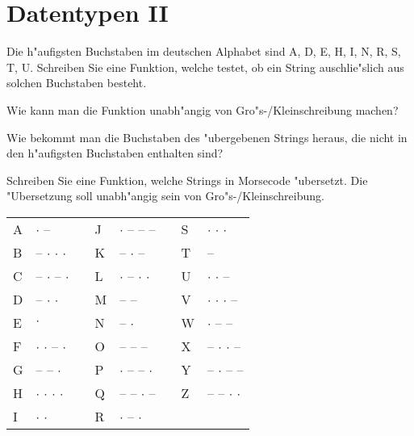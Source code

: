 \section*{Datentypen II}

\begin{aufgabe}
Die h"aufigsten Buchstaben im deutschen Alphabet sind A, D, E, H, I, N, R, S, T, U. Schreiben Sie eine Funktion, welche testet, ob ein String auschlie"slich aus solchen Buchstaben besteht.
\begin{teilaufgabe}
Wie kann man die Funktion unabh"angig von Gro"s-/Kleinschreibung machen?
\end{teilaufgabe}
\begin{teilaufgabe}
Wie bekommt man die Buchstaben des "ubergebenen Strings heraus, die nicht in den h"aufigsten Buchstaben enthalten sind?
\end{teilaufgabe}
\end{aufgabe}


\begin{aufgabe}[Morsecode]
Schreiben Sie eine Funktion, welche Strings in Morsecode "ubersetzt. Die "Ubersetzung soll unabh"angig sein von Gro"s-/Kleinschreibung.

\begin{tabular}[h]{|l|ll|l|ll|l|l|}
\hline
A&$\cdot$ --&&J&$\cdot$ -- -- --&&S&$\cdot$ $\cdot$ $\cdot$\\
B&-- $\cdot$ $\cdot$ $\cdot$&&K&-- $\cdot$ --&&T&--\\
C&-- $\cdot$ -- $\cdot$&&L&$\cdot$ -- $\cdot$ $\cdot$&&U&$\cdot$ $\cdot$ --\\
D&-- $\cdot$ $\cdot$&&M&-- --&&V&$\cdot$ $\cdot$ $\cdot$ --\\
E&$\cdot$&&N&-- $\cdot$&&W&$\cdot$ -- --\\
F&$\cdot$ $\cdot$ -- $\cdot$&&O&-- -- --&&X&-- $\cdot$ $\cdot$ --\\
G&-- -- $\cdot$&&P&$\cdot$ -- -- $\cdot$&&Y&-- $\cdot$ -- --\\
H&$\cdot$ $\cdot$ $\cdot$ $\cdot$&&Q&-- -- $\cdot$ --&&Z&-- -- $\cdot$ $\cdot$\\
I&$\cdot$ $\cdot$&&R&$\cdot$ -- $\cdot$&&&\\
\hline
\end{tabular}
\end{aufgabe}

